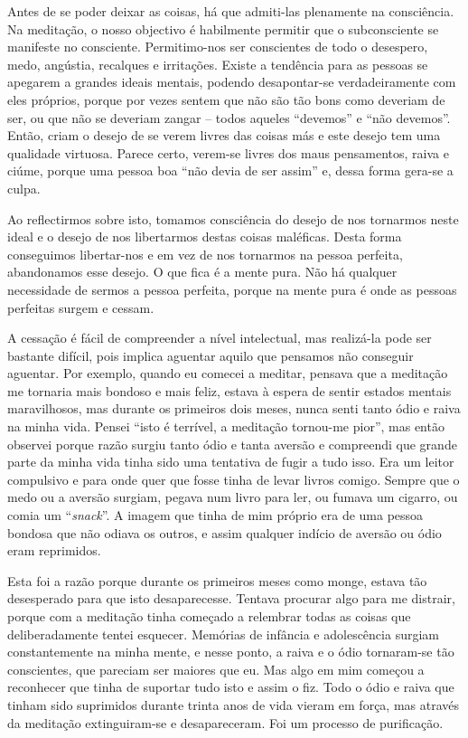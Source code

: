 Antes de se poder deixar as coisas, há que admiti-las plenamente na consciência.
Na meditação, o nosso objectivo é habilmente permitir que o subconsciente se
manifeste no consciente. Permitimo-nos ser conscientes de todo o desespero, medo, angústia, recalques e irritações. Existe a tendência para as
pessoas se apegarem a grandes ideais mentais, podendo desapontar-se
verdadeiramente com eles próprios, porque por vezes sentem que não são tão bons
como deveriam de ser, ou que não se deveriam zangar -- todos aqueles “devemos” e “não
devemos”. Então, criam o desejo de se verem livres das coisas más e este desejo
tem uma qualidade virtuosa. Parece certo, verem-se livres dos maus pensamentos,
raiva e ciúme, porque uma pessoa boa “não devia de ser assim” e, dessa forma
gera-se a culpa.

Ao reflectirmos sobre isto, tomamos consciência do desejo de nos tornarmos neste
ideal e o desejo de nos libertarmos destas coisas maléficas. Desta forma conseguimos
libertar-nos e em vez de nos tornarmos na pessoa perfeita, abandonamos esse
desejo. O que fica é a mente pura. Não há qualquer necessidade de sermos a
pessoa perfeita, porque na mente pura é onde as pessoas perfeitas surgem e
cessam.

A cessação é fácil de compreender a nível intelectual, mas realizá-la pode ser
bastante difícil, pois implica aguentar aquilo que pensamos não conseguir aguentar. Por exemplo, quando eu comecei a meditar, pensava que a meditação me tornaria mais
bondoso e mais feliz, estava à espera de sentir estados mentais maravilhosos,
mas durante os primeiros dois meses, nunca senti tanto ódio e raiva na minha
vida. Pensei “isto é terrível, a meditação tornou-me pior”, mas então observei
porque razão surgiu tanto ódio e tanta aversão e compreendi que grande parte da
minha vida tinha sido uma tentativa de fugir a tudo isso. Era um leitor
compulsivo e para onde quer que fosse tinha de levar livros comigo. Sempre que o
medo ou a aversão surgiam, pegava num livro para ler, ou fumava um cigarro, ou
comia um “\emph{snack}”. A imagem que tinha de mim próprio era de uma pessoa
bondosa que não odiava os outros, e assim qualquer indício de aversão ou ódio eram
reprimidos.

Esta foi a razão porque durante os primeiros meses como monge, estava tão
desesperado para que isto desaparecesse. Tentava procurar algo para me distrair,
porque com a meditação tinha começado a relembrar todas as coisas que
deliberadamente tentei esquecer. Memórias de infância e adolescência surgiam
constantemente na minha mente, e nesse ponto, a raiva e o ódio tornaram-se tão
conscientes, que pareciam ser maiores que eu. Mas algo em mim começou a
reconhecer que tinha de suportar tudo isto e assim o fiz. Todo o ódio e raiva
que tinham sido suprimidos durante trinta anos de vida vieram em força, mas
através da meditação extinguiram-se e desapareceram. Foi um processo de
purificação.

